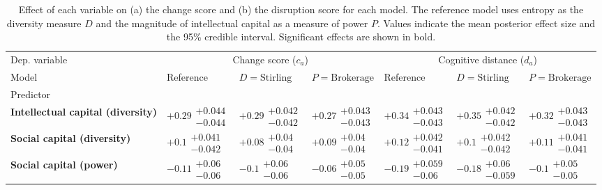 \begin{table}[H]
\caption{Effect of each variable on (a) the change score and (b) the disruption score for each model. The reference model uses entropy as the diversity measure $D$ and the magnitude of intellectual capital as a measure of power $P$. Values indicate the mean posterior effect size and the 95\% credible interval. Significant effects are shown in bold.}
\label{table:summary_change_disruption}
\renewcommand{\arraystretch}{2}\fontsize{6}{7}\selectfont\begin{tabular}{lllllll}
\toprule
Dep. variable & \multicolumn{3}{c}{Change score ($c_a$)} & \multicolumn{3}{c}{Cognitive distance ($d_a$)} \\
Model & Reference & $D=\text{Stirling}$ & $P=\text{Brokerage}$ & Reference & $D=\text{Stirling}$ & $P=\text{Brokerage}$ \\
Predictor &  &  &  &  &  &  \\
\midrule
\textbf{Intellectual capital (diversity)} & $\bm{+0.29}\substack{+0.044 \\ -0.044}$ & $\bm{+0.29}\substack{+0.042 \\ -0.042}$ & $\bm{+0.27}\substack{+0.043 \\ -0.043}$ & $\bm{+0.34}\substack{+0.043 \\ -0.043}$ & $\bm{+0.35}\substack{+0.042 \\ -0.042}$ & $\bm{+0.32}\substack{+0.043 \\ -0.043}$ \\
\textbf{Social capital (diversity)} & $\bm{+0.1}\substack{+0.041 \\ -0.042}$ & $\bm{+0.08}\substack{+0.04 \\ -0.04}$ & $\bm{+0.09}\substack{+0.04 \\ -0.04}$ & $\bm{+0.12}\substack{+0.042 \\ -0.041}$ & $\bm{+0.1}\substack{+0.042 \\ -0.042}$ & $\bm{+0.11}\substack{+0.041 \\ -0.041}$ \\
\textbf{Social capital (power)} & $\bm{-0.11}\substack{+0.06 \\ -0.06}$ & $\bm{-0.1}\substack{+0.06 \\ -0.06}$ & $\bm{-0.06}\substack{+0.05 \\ -0.05}$ & $\bm{-0.19}\substack{+0.059 \\ -0.06}$ & $\bm{-0.18}\substack{+0.06 \\ -0.059}$ & $\bm{-0.1}\substack{+0.05 \\ -0.05}$ \\

\end{tabular}
\end{table}
